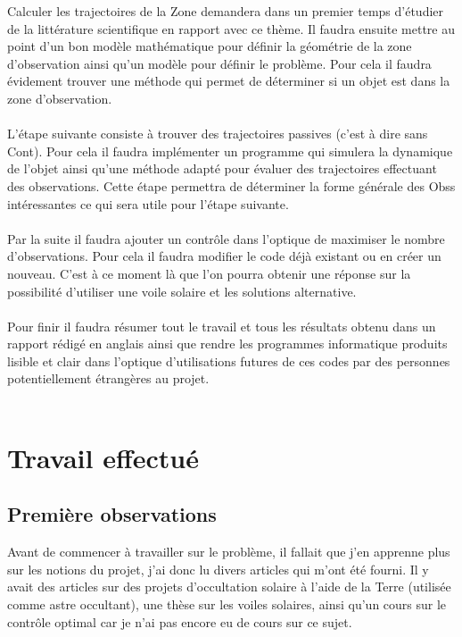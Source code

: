 \documentclass[12pt]{article} %
\begin{document}
		Calculer les trajectoires de la \gls{Zone} demandera dans un premier temps d'étudier de la littérature scientifique en rapport avec ce thème. Il faudra ensuite mettre au point d'un bon modèle mathématique pour définir la géométrie de la zone d'observation ainsi qu'un modèle pour définir le problème. Pour cela il faudra évidement trouver une méthode qui permet de déterminer si un objet est dans la zone d'observation.
		\\ \\
		L'étape suivante consiste à trouver des trajectoires passives (c'est à dire sans \gls{Cont}). Pour cela il faudra implémenter un programme qui simulera la dynamique de l'objet ainsi qu'une méthode adapté pour évaluer des trajectoires effectuant des observations. Cette étape permettra de déterminer la forme générale  des \glspl{Obs} intéressantes ce qui sera utile pour l'étape suivante.
		\\ \\
		Par la suite il faudra ajouter un contrôle dans l'optique de maximiser le nombre d'observations. Pour cela il faudra modifier le code déjà existant ou en créer un nouveau. C'est à ce moment là que l'on pourra obtenir une réponse sur la possibilité d'utiliser une voile solaire et les solutions alternative.
		\\ \\
		Pour finir il faudra résumer tout le travail et tous les résultats obtenu dans un rapport rédigé en anglais ainsi que rendre les programmes informatique produits lisible et clair dans l'optique d'utilisations futures de ces codes par des personnes potentiellement étrangères au projet.
		\\ \\
		
		\newpage
		\section{Travail effectué}
		
		\subsection{Première observations}
		Avant de commencer à travailler sur le problème, il fallait que j'en apprenne plus sur les notions du projet, j'ai donc lu divers articles qui m'ont été fourni. Il y avait des articles sur des projets d'occultation solaire à l'aide de la Terre (utilisée comme astre occultant), une thèse sur les voiles solaires, ainsi qu'un cours sur le contrôle optimal car je n'ai pas encore eu de cours sur ce sujet.
		
\end{document}
